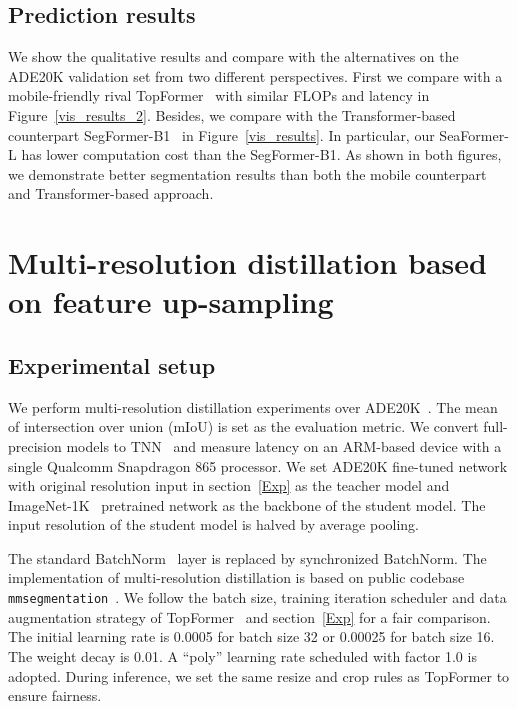 \subsection{Prediction results}
We show the qualitative results and compare with the alternatives on the ADE20K validation set from two different perspectives. 
First we compare with a mobile-friendly rival TopFormer~\cite{zhang2022topformer} with similar FLOPs and latency in Figure~\ref{vis_results_2}. 
Besides, we compare with the Transformer-based counterpart SegFormer-B1~\cite{xie2021segformer} in Figure~\ref{vis_results}.
In particular, our SeaFormer-L has lower computation cost than the SegFormer-B1.
As shown in both figures, we demonstrate better segmentation results than both the mobile counterpart and Transformer-based approach.

\section{Multi-resolution distillation based on feature up-sampling}
\subsection{Experimental setup} We perform multi-resolution distillation experiments over ADE20K~\cite{zhou2017scene}. The mean of intersection over union (mIoU) is set as the evaluation metric. 
We convert full-precision models to TNN~\cite{contributors2020tnn} and measure latency on an ARM-based device with a single Qualcomm Snapdragon 865 processor.
We set ADE20K fine-tuned network with original resolution input in section~\ref{Exp} as the teacher model and ImageNet-1K~\cite{deng2009imagenet} pretrained network as the backbone of the student model.
The input resolution of the student model is halved by average pooling.

The standard BatchNorm~\cite{ioffe2015batch} layer is replaced by synchronized BatchNorm.
The implementation of multi-resolution distillation is based on public codebase \texttt{mmsegmentation}~\cite{contributors2020mmsegmentation}.
We follow the batch size, training iteration scheduler and data augmentation strategy of TopFormer~\cite{zhang2022topformer} and section~\ref{Exp} for a fair comparison.
The initial learning rate is 0.0005 for batch size 32 or 0.00025 for batch size 16. The weight decay is 0.01. 
A “poly” learning rate scheduled with factor 1.0 is adopted.
During inference, we set the same resize and crop rules as TopFormer to ensure fairness.

